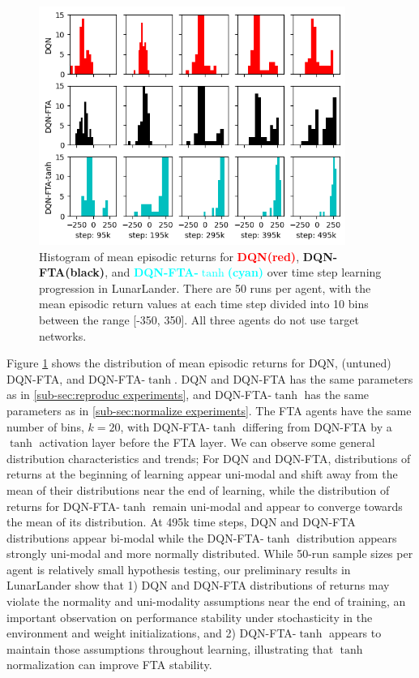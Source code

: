 \documentclass{article}
\begin{document}
\begin{figure}[h]
    \centering
    \includegraphics[width=10cm]{distribution.png}
    \caption{Histogram of mean episodic returns for {\textcolor{red} {\bf DQN(red)}}, {\bf DQN-FTA(black)}, and {\textcolor{cyan} {\bf DQN-FTA-$\tanh$(cyan)}} over time step learning progression in LunarLander. There are 50 runs per agent, with the mean episodic return values at each time step divided into 10 bins between the range [-350, 350]. All three agents do not use target networks.}
    \label{fig:dist}
\end{figure}
\newpage
Figure \ref{fig:dist} shows the distribution of mean episodic returns for DQN, (untuned) DQN-FTA, and DQN-FTA-$\tanh$. DQN and DQN-FTA has the same parameters as in \ref{sub-sec:reproduc experiments}, and DQN-FTA-$\tanh$ has the same parameters as in \ref{sub-sec:normalize experiments}. The FTA agents have the same number of bins, $k=20$, with DQN-FTA-$\tanh$ differing from DQN-FTA by a $\tanh$ activation layer before the FTA layer. We can observe some general distribution characteristics and trends; For DQN and DQN-FTA, distributions of returns at the beginning of learning appear uni-modal and shift away from the mean of their distributions near the end of learning, while the distribution of returns for DQN-FTA-$\tanh$ remain uni-modal and appear to converge towards the mean of its distribution. At 495k time steps, DQN and DQN-FTA distributions appear bi-modal while the DQN-FTA-$\tanh$ distribution appears strongly uni-modal and more normally distributed. While 50-run sample sizes per agent is relatively small hypothesis testing, our preliminary results in LunarLander show that 1) DQN and DQN-FTA distributions of returns may violate the normality and uni-modality assumptions near the end of training, an important observation on performance stability under stochasticity in the environment and weight initializations, and 2) DQN-FTA-$\tanh$ appears to maintain those assumptions throughout learning, illustrating that $\tanh$ normalization can improve FTA stability.
\end{document}
